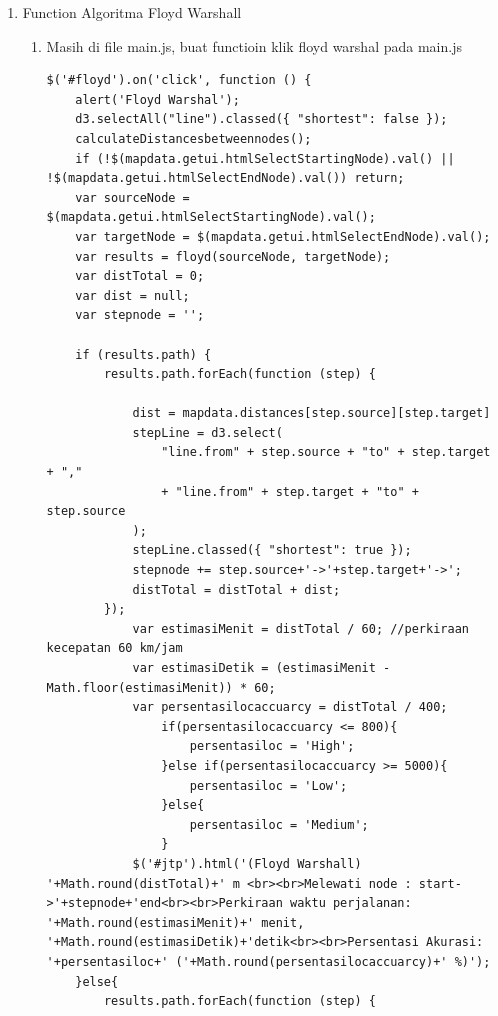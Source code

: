 \begin{enumerate}
\begin{enumerate}
    \item Function Algoritma Floyd Warshall
    \begin{enumerate}
        \item Masih di file main.js, buat functioin klik floyd warshal pada main.js
\begin{lstlisting}[caption=Function OnClick Dijsktra]
$('#floyd').on('click', function () {
    alert('Floyd Warshal');
    d3.selectAll("line").classed({ "shortest": false });
    calculateDistancesbetweennodes();
    if (!$(mapdata.getui.htmlSelectStartingNode).val() || !$(mapdata.getui.htmlSelectEndNode).val()) return;
    var sourceNode = $(mapdata.getui.htmlSelectStartingNode).val();
    var targetNode = $(mapdata.getui.htmlSelectEndNode).val();
    var results = floyd(sourceNode, targetNode);
    var distTotal = 0;
    var dist = null;
    var stepnode = '';
    
    if (results.path) {
        results.path.forEach(function (step) {

            dist = mapdata.distances[step.source][step.target]
            stepLine = d3.select(
                "line.from" + step.source + "to" + step.target + ","
                + "line.from" + step.target + "to" + step.source
            );
            stepLine.classed({ "shortest": true });
            stepnode += step.source+'->'+step.target+'->';
            distTotal = distTotal + dist;
        });
            var estimasiMenit = distTotal / 60; //perkiraan kecepatan 60 km/jam
            var estimasiDetik = (estimasiMenit - Math.floor(estimasiMenit)) * 60;
            var persentasilocaccuarcy = distTotal / 400;
                if(persentasilocaccuarcy <= 800){
                    persentasiloc = 'High';
                }else if(persentasilocaccuarcy >= 5000){
                    persentasiloc = 'Low';
                }else{
                    persentasiloc = 'Medium';
                }
            $('#jtp').html('(Floyd Warshall) '+Math.round(distTotal)+' m <br><br>Melewati node : start->'+stepnode+'end<br><br>Perkiraan waktu perjalanan: '+Math.round(estimasiMenit)+' menit, '+Math.round(estimasiDetik)+'detik<br><br>Persentasi Akurasi: '+persentasiloc+' ('+Math.round(persentasilocaccuarcy)+' %)');
    }else{
        results.path.forEach(function (step) {


\end{lstlisting}
\end{enumerate}
\end{enumerate}
\end{enumerate}
